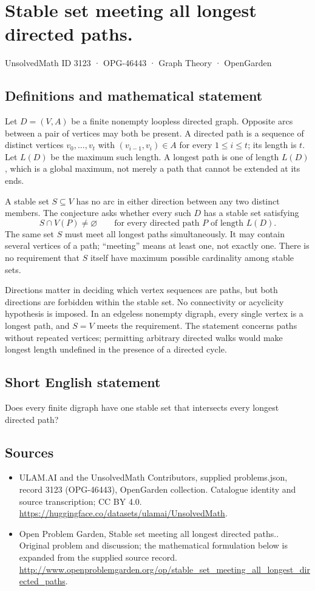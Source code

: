 \documentclass[11pt,a4paper]{article}
\begin{document}
\section*{Stable set meeting all longest directed paths.}\label{3123}
{\small UnsolvedMath ID 3123 · OPG-46443 · Graph Theory · OpenGarden}
\subsection{Definitions and mathematical statement}
Let $D=(V,A)$ be a finite nonempty loopless directed graph. Opposite
arcs between a pair of vertices may both be present. A directed path
is a sequence of distinct vertices $v_0,\ldots,v_t$ with
$(v_{i-1},v_i)\in A$ for every $1\le i\le t$; its length is $t$.
Let $L(D)$ be the maximum such length. A longest path is one of length
$L(D)$, which is a global maximum, not merely a path that cannot be
extended at its ends.

A stable set $S\subseteq V$ has no arc in either direction between
any two distinct members. The conjecture asks whether every such
$D$ has a stable set satisfying
\[
 S\cap V(P)\ne\varnothing
          \qquad\text{for every directed path }P\text{ of length }L(D).
\]
The same set $S$ must meet all longest paths simultaneously. It may
contain several vertices of a path; ``meeting'' means at least one,
not exactly one. There is no requirement that $S$ itself have maximum
possible cardinality among stable sets.

Directions matter in deciding which vertex sequences are paths, but
both directions are forbidden within the stable set. No connectivity
or acyclicity hypothesis is imposed. In an edgeless nonempty digraph,
every single vertex is a longest path, and $S=V$ meets the requirement.
The statement concerns paths without repeated vertices; permitting
arbitrary directed walks would make longest length undefined in the
presence of a directed cycle.
\subsection{Short English statement}
Does every finite digraph have one stable set that intersects every longest directed path?
\subsection{Sources}
\begin{itemize}
\item[S1] ULAM.AI and the UnsolvedMath Contributors, supplied problems.json, record 3123 (OPG-46443), OpenGarden collection. Catalogue identity and source transcription; CC BY 4.0.
\url{https://huggingface.co/datasets/ulamai/UnsolvedMath}.
\item[S2] Open Problem Garden, Stable set meeting all longest directed paths.. Original problem and discussion; the mathematical formulation below is expanded from the supplied source record.
\url{http://www.openproblemgarden.org/op/stable_set_meeting_all_longest_directed_paths}.
\end{itemize}
\end{document}
